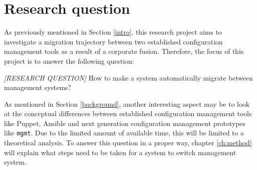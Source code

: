 \section{Research question}\label{sec:researchquestion}
As previously mentioned in Section \ref{intro}, this research project aims to investigate a migration trajectory between two established configuration management tools as a result of a corporate fusion. Therefore, the focus of this project is to answer the following question:

\textit{[RESEARCH QUESTION]}
How to make a system automatically migrate between management systems?

As mentioned in Section \ref{background}, another interesting aspect may be to look at the conceptual differences between established configuration management tools like Puppet, Ansible and next generation configuration management prototypes like \texttt{mgmt}. Due to the limited amount of available time, this will be limited to a theoretical analysis. 
To answer this question in a proper way, chapter \ref{ch:method} will explain what steps need to be taken for a system to switch management system.
